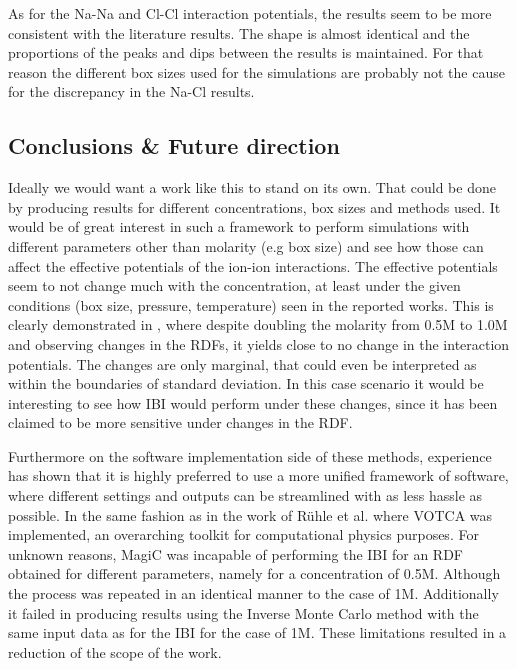 \documentclass[10pt]{article}
\begin{document}
        As for the Na-Na and Cl-Cl interaction potentials, the results seem to be more consistent with the literature results. The shape is almost identical and the proportions of the peaks and dips between the results is maintained. For that reason the different box sizes used for the simulations are probably not the cause for the discrepancy in the Na-Cl results.



    \subsection{Conclusions \& Future direction}
    
    Ideally we would want a work like this to stand on its own. That could be done by producing results for different concentrations, box sizes and methods used. It would be of great interest in such a framework to perform simulations with different parameters other than molarity (e.g box size) and see how those can affect the effective potentials of the ion-ion interactions. The effective potentials seem to not change much with the concentration, at least under the given conditions (box size, pressure, temperature) seen in the reported works. This is clearly demonstrated in \cite{Lyubartsev2}, where despite doubling the molarity from 0.5M to 1.0M and observing changes in the RDFs, it yields close to no change in the interaction potentials. The changes are only marginal, that could even be interpreted as within the boundaries of standard deviation. In this case scenario it would be interesting to see how IBI would perform under these changes, since it has been claimed to be more sensitive under changes in the RDF.

    Furthermore on the software implementation side of these methods, experience has shown that it is highly preferred to use a more unified framework of software, where different settings and outputs can be streamlined with as less hassle as possible. In the same fashion as in the work of Rühle et al. \cite{Ruhle} where VOTCA was implemented, an overarching toolkit for computational physics purposes. For unknown reasons, MagiC was incapable of performing the IBI for an RDF obtained for different parameters, namely for a concentration of 0.5M. Although the process was repeated in an identical manner to the case of 1M. Additionally it failed in producing results using the Inverse Monte Carlo method with the same input data as for the IBI for the case of 1M. These limitations resulted in a reduction of the scope of the work.
\end{document}
